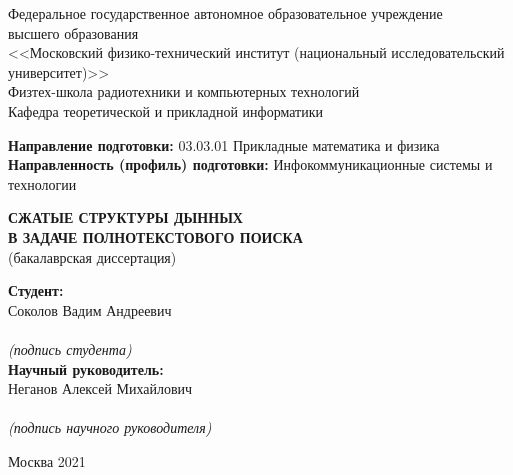 \begin{center}
    Федеральное государственное автономное образовательное учреждение\\
    высшего образования\\
    <<Московский физико-технический институт (национальный исследовательский университет)>>\\
    Физтех-школа радиотехники и компьютерных технологий\\
    Кафедра теоретической и прикладной информатики\\
\end{center}

\vspace{2mm}

\begin{flushleft}
    \textbf{Направление подготовки:} 03.03.01 Прикладные математика и физика\\
    \textbf{Направленность (профиль) подготовки:} Инфокоммуникационные системы и технологии\\
\end{flushleft}

\vspace{24mm}

\begin{center}
    \large{\textbf{СЖАТЫЕ СТРУКТУРЫ ДЫННЫХ\\В ЗАДАЧЕ ПОЛНОТЕКСТОВОГО ПОИСКА}}\\
    (бакалаврская диссертация)\\
\end{center}

\vspace{20mm}

\hspace{90mm}
\begin{minipage}{0.4\textwidth}
    \begin{flushleft}
        \textbf{Студент:}\\Соколов Вадим Андреевич\\
        \vspace{4mm}
        \hrulefill\\
        {\centering\scriptsize\textit{(подпись студента)}\\}
        \textbf{Научный руководитель:}\\Неганов Алексей Михайлович\\
        \vspace{4mm}
        \hrulefill\\
        {\centering\scriptsize\textit{(подпись научного руководителя)}\\}
    \end{flushleft}
\end{minipage}

\vspace*{\fill}

\begin{center}
    Москва 2021
\end{center}

\thispagestyle{empty}